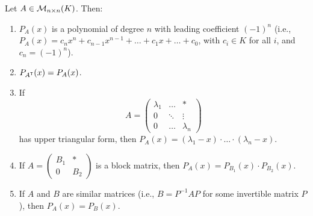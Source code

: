 \begin{lemma}\label{lem:properties_char_poly}
  Let $A \in \mathcal{M}_{n \times n}(K)$. Then:
  \begin{enumerate}[label=\textbf{(\alph*)}]
    \item $P_A(x)$ is a polynomial of degree $n$ with leading coefficient $(-1)^n$ (i.e., $P_A(x) = c_n x^n + c_{n-1} x^{n-1} + \dots + c_1 x + \dots + c_0$, with $c_i \in K$ for all $i$, and $c_n = (-1)^n$).
    \item $P_{A^{\mathsf{T}}}(x) = P_A(x)$.
    \item If
    \[
    A = \begin{pmatrix} \lambda_1 & \dots & * \\ 0 & \ddots & \vdots \\ 0 & \dots & \lambda_n \end{pmatrix}
    \]
    has upper triangular form, then $P_A(x) = (\lambda_1 - x) \cdot \dots \cdot (\lambda_n - x)$.
    \item If $A = \left(\begin{array}{c|c} B_1 & * \\ \hline 0 & B_2 \end{array}\right)$ is a block matrix, then $P_A(x) = P_{B_1}(x) \cdot P_{B_2}(x)$.
    \item If $A$ and $B$ are similar matrices (i.e., $B = P^{-1}AP$ for some invertible matrix $P$), then $P_A(x) = P_B(x)$.
  \end{enumerate}
\end{lemma}

